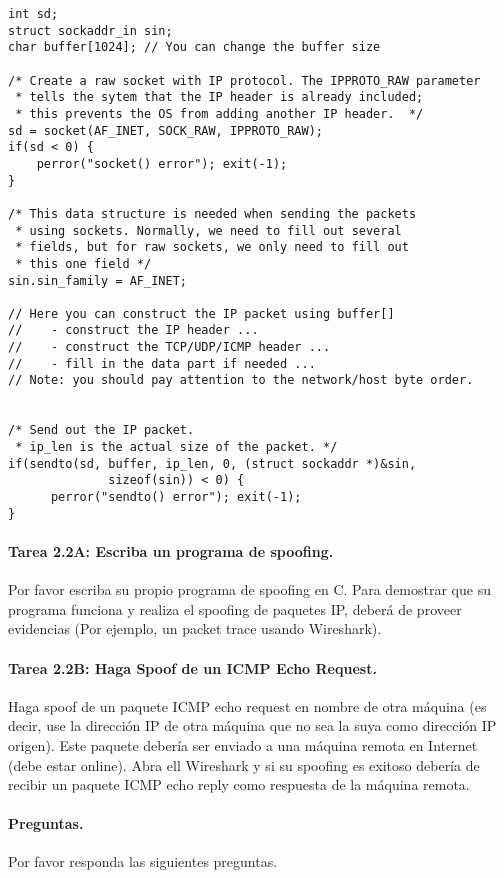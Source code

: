 \begin{lstlisting}
int sd;
struct sockaddr_in sin;
char buffer[1024]; // You can change the buffer size

/* Create a raw socket with IP protocol. The IPPROTO_RAW parameter
 * tells the sytem that the IP header is already included;
 * this prevents the OS from adding another IP header.  */
sd = socket(AF_INET, SOCK_RAW, IPPROTO_RAW);
if(sd < 0) {
    perror("socket() error"); exit(-1);
}

/* This data structure is needed when sending the packets 
 * using sockets. Normally, we need to fill out several 
 * fields, but for raw sockets, we only need to fill out
 * this one field */
sin.sin_family = AF_INET;

// Here you can construct the IP packet using buffer[]  
//    - construct the IP header ...
//    - construct the TCP/UDP/ICMP header ...
//    - fill in the data part if needed ...
// Note: you should pay attention to the network/host byte order.


/* Send out the IP packet. 
 * ip_len is the actual size of the packet. */  
if(sendto(sd, buffer, ip_len, 0, (struct sockaddr *)&sin, 
              sizeof(sin)) < 0) {
      perror("sendto() error"); exit(-1);
}
\end{lstlisting}



\paragraph{Tarea 2.2A: Escriba un programa de spoofing.}
Por favor escriba su propio programa de spoofing en C. Para demostrar que su programa funciona y realiza el spoofing de paquetes IP, deberá de proveer evidencias (Por ejemplo, un packet trace usando Wireshark).


\paragraph{Tarea 2.2B: Haga Spoof de un ICMP Echo Request.}
Haga spoof de un paquete ICMP echo request en nombre de otra máquina (es decir, use la dirección IP de otra máquina que no sea la suya como dirección IP origen). Este paquete debería ser enviado a una máquina remota en Internet (debe estar online). Abra ell Wireshark y si su spoofing es exitoso debería de recibir un paquete ICMP echo reply como respuesta de la máquina remota.

\paragraph{Preguntas.} Por favor responda las siguientes preguntas.

